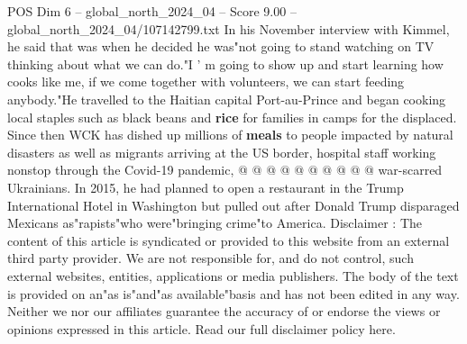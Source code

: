 \begin{textsample}{POS Dim 6 – global\_north\_2024\_04 – Score 9.00 – global\_north\_2024\_04/107142799.txt}
In his November interview with Kimmel, he said that was when he decided he was"not going to stand watching on TV thinking about what we can do."I ' m going to show up and start learning how cooks like me, if we come together with volunteers, we can start feeding anybody."He travelled to the Haitian capital Port-au-Prince and began cooking local staples such as black beans and \textbf{rice} for families in camps for the displaced.
Since then WCK has dished up millions of \textbf{meals} to people impacted by natural disasters as well as migrants arriving at the US border, hospital staff working nonstop through the Covid-19 pandemic, @ @ @ @ @ @ @ @ @ @ war-scarred Ukrainians.
In 2015, he had planned to open a restaurant in the Trump International Hotel in Washington but pulled out after Donald Trump disparaged Mexicans as"rapists"who were"bringing crime"to America.
Disclaimer : The content of this article is syndicated or provided to this website from an external third party provider.
We are not responsible for, and do not control, such external websites, entities, applications or media publishers.
The body of the text is provided on an"as is"and"as available"basis and has not been edited in any way.
Neither we nor our affiliates guarantee the accuracy of or endorse the views or opinions expressed in this article.
Read our full disclaimer policy here.

\end{textsample}
